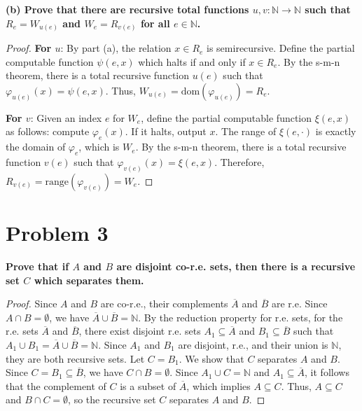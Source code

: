 \documentclass{article}
\begin{document}
\textbf{(b) Prove that there are recursive total functions $u, v: \mathbb{N} \to \mathbb{N}$ such that $R_e = W_{u(e)}$ and $W_e = R_{v(e)}$ for all $e \in \mathbb{N}$.}

\begin{proof}
\textbf{For $u$}: By part (a), the relation $x \in R_e$ is semirecursive. Define the partial computable function $\psi(e, x)$ which halts if and only if $x \in R_e$. By the s-m-n theorem, there is a total recursive function $u(e)$ such that $\varphi_{u(e)}(x) = \psi(e, x)$. Thus, $W_{u(e)} = \text{dom}(\varphi_{u(e)}) = R_e$.

\textbf{For $v$}: Given an index $e$ for $W_e$, define the partial computable function $\xi(e, x)$ as follows: compute $\varphi_e(x)$. If it halts, output $x$. The range of $\xi(e, \cdot)$ is exactly the domain of $\varphi_e$, which is $W_e$. By the s-m-n theorem, there is a total recursive function $v(e)$ such that $\varphi_{v(e)}(x) = \xi(e, x)$. Therefore, $R_{v(e)} = \text{range}(\varphi_{v(e)}) = W_e$.
\end{proof}

\hrulefill

\section*{Problem 3}
\textbf{Prove that if $A$ and $B$ are disjoint co-r.e. sets, then there is a recursive set $C$ which separates them.}

\begin{proof}
Since $A$ and $B$ are co-r.e., their complements $\overline{A}$ and $\overline{B}$ are r.e.
Since $A \cap B = \emptyset$, we have $\overline{A} \cup \overline{B} = \mathbb{N}$.
By the reduction property for r.e. sets, for the r.e. sets $\overline{A}$ and $\overline{B}$, there exist disjoint r.e. sets $A_1 \subseteq \overline{A}$ and $B_1 \subseteq \overline{B}$ such that $A_1 \cup B_1 = \overline{A} \cup \overline{B} = \mathbb{N}$.
Since $A_1$ and $B_1$ are disjoint, r.e., and their union is $\mathbb{N}$, they are both recursive sets.
Let $C = B_1$. We show that $C$ separates $A$ and $B$. Since $C = B_1 \subseteq \overline{B}$, we have $C \cap B = \emptyset$. Since $A_1 \cup C = \mathbb{N}$ and $A_1 \subseteq \overline{A}$, it follows that the complement of $C$ is a subset of $\overline{A}$, which implies $A \subseteq C$.
Thus, $A \subseteq C$ and $B \cap C = \emptyset$, so the recursive set $C$ separates $A$ and $B$.
\end{proof}
\end{document}
